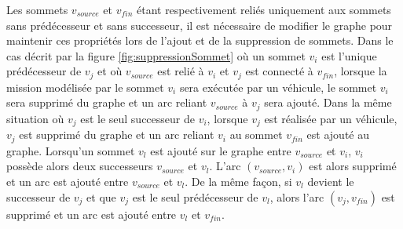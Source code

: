 Les sommets $v_{source}$ et $v_{fin}$ étant respectivement reliés uniquement aux sommets sans prédécesseur et sans successeur, il est nécessaire de modifier le graphe pour maintenir ces propriétés lors de l'ajout et de la suppression de sommets. 
Dans le cas décrit par la figure \ref{fig:suppressionSommet} où un sommet $v_i$ est l'unique prédécesseur de $v_j$ et où $v_{source}$ est relié à $v_i$ et $v_j$ est connecté à $v_{fin}$, lorsque la mission modélisée par le sommet $v_i$ sera exécutée par un véhicule, le sommet $v_i$ sera supprimé du graphe et un arc reliant $v_{source}$ à $v_j$ sera ajouté.
Dans la même situation où $v_j$ est le seul successeur de $v_i$, lorsque $v_j$ est réalisée par un véhicule, $v_j$ est supprimé du graphe et un arc reliant $v_i$ au sommet $v_{fin}$ est ajouté au graphe.
Lorsqu'un sommet $v_l$ est ajouté sur le graphe entre $v_{source}$ et $v_i$, $v_i$ possède alors deux successeurs  $v_{source}$ et $v_l$. L'arc $(v_{source},v_i)$ est alors supprimé et un arc est ajouté entre $v_{source}$ et $v_l$.
De la même façon, si $v_l$ devient le successeur de $v_j$ et que $v_j$ est le seul prédécesseur de $v_l$, alors l'arc $(v_j,v_{fin})$ est supprimé et un arc est ajouté entre $v_l$ et $v_{fin}$.

